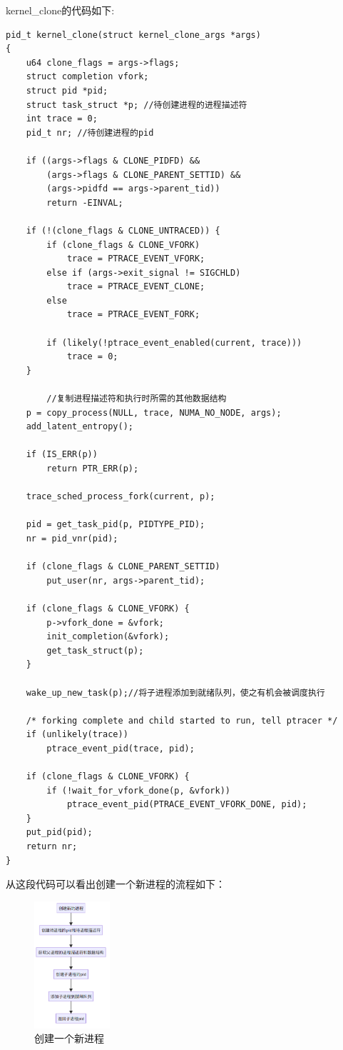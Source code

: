 \documentclass[lang=cn,10pt]{elegantbook}
\begin{document}
kernel\_clone的代码如下:
\begin{lstlisting}
pid_t kernel_clone(struct kernel_clone_args *args)
{
	u64 clone_flags = args->flags;
	struct completion vfork;
	struct pid *pid;
	struct task_struct *p; //待创建进程的进程描述符
	int trace = 0;
	pid_t nr; //待创建进程的pid

	if ((args->flags & CLONE_PIDFD) &&
	    (args->flags & CLONE_PARENT_SETTID) &&
	    (args->pidfd == args->parent_tid))
		return -EINVAL;

	if (!(clone_flags & CLONE_UNTRACED)) {
		if (clone_flags & CLONE_VFORK)
			trace = PTRACE_EVENT_VFORK;
		else if (args->exit_signal != SIGCHLD)
			trace = PTRACE_EVENT_CLONE;
		else
			trace = PTRACE_EVENT_FORK;

		if (likely(!ptrace_event_enabled(current, trace)))
			trace = 0;
	}

        //复制进程描述符和执行时所需的其他数据结构
	p = copy_process(NULL, trace, NUMA_NO_NODE, args);
	add_latent_entropy();

	if (IS_ERR(p))
		return PTR_ERR(p);

	trace_sched_process_fork(current, p);

	pid = get_task_pid(p, PIDTYPE_PID);
	nr = pid_vnr(pid);

	if (clone_flags & CLONE_PARENT_SETTID)
		put_user(nr, args->parent_tid);

	if (clone_flags & CLONE_VFORK) {
		p->vfork_done = &vfork;
		init_completion(&vfork);
		get_task_struct(p);
	}

	wake_up_new_task(p);//将子进程添加到就绪队列，使之有机会被调度执行

	/* forking complete and child started to run, tell ptracer */
	if (unlikely(trace))
		ptrace_event_pid(trace, pid);

	if (clone_flags & CLONE_VFORK) {
		if (!wait_for_vfork_done(p, &vfork))
			ptrace_event_pid(PTRACE_EVENT_VFORK_DONE, pid);
	}
	put_pid(pid);
	return nr;
}

\end{lstlisting}
从这段代码可以看出创建一个新进程的流程如下：
\begin{figure}[htbp]
  \centering
  \includegraphics[width=0.25\textwidth]{image/fork.png}
  \caption{创建一个新进程}
\end{figure}
\end{document}

